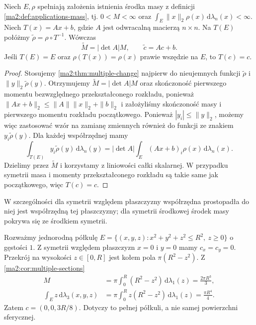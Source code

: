\begin{twierdzenie}
\label{ma2:thm:applications-center-affine}
Niech $E,\rho$ spełniają założenia istnienia
środka masy z definicji
\ref{ma2:def:applications-mass}, tj. $0<M<\infty$
oraz $\int_E\|x\|_2\rho(x)\,\mathrm d\lambda_n(x)<\infty$.
Niech
$T(x)=Ax+b$, gdzie $A$ jest odwracalną
macierzą $n\times n$. Na $T(E)$ połóżmy
$\widetilde\rho=\rho\circ T^{-1}$.
Wówczas
\[
 \widetilde M=|\det A|M,\qquad
 \widetilde c=Ac+b.
\]
Jeśli $T(E)=E$ oraz
$\rho(T(x))=\rho(x)$ prawie wszędzie na $E$,
to $T(c)=c$.
\end{twierdzenie}
\begin{proof}
Stosujemy \ref{ma2:thm:multiple-change}
najpierw do nieujemnych funkcji
$\widetilde\rho$ i $\|y\|_2\widetilde\rho(y)$.
Otrzymujemy $\widetilde M=|\det A|M$
oraz skończoność pierwszego momentu
bezwzględnego przekształconego rozkładu, ponieważ
$\|Ax+b\|_2\le\|A\|\|x\|_2+\|b\|_2$
i założyliśmy skończoność masy i pierwszego
momentu rozkładu początkowego.
Ponieważ $|y_i|\le\|y\|_2$, możemy więc
zastosować wzór na zamianę zmiennych
również do funkcji ze znakiem
$y_i\widetilde\rho(y)$.
Dla każdej współrzędnej mamy
\[
 \int_{T(E)}y_i\widetilde\rho(y)\,
 \mathrm d\lambda_n(y)
 =|\det A|\int_E (Ax+b)_i\rho(x)\,
 \mathrm d\lambda_n(x).
\]
Dzielimy przez $\widetilde M$ i korzystamy
z liniowości całki skalarnej.
W przypadku symetrii masa i momenty
przekształconego rozkładu są takie same
jak początkowego, więc $T(c)=c$.
\end{proof}
W szczególności dla symetrii względem
płaszczyzny współrzędna prostopadła do niej
jest współrzędną tej płaszczyzny; dla
symetrii środkowej środek masy pokrywa się
ze środkiem symetrii.

\begin{przyklad}
\label{ma2:ex:applications-hemisphere}
Rozważmy jednorodną półkulę
$E=\{(x,y,z):x^2+y^2+z^2\le R^2,\ z\ge0\}$
o gęstości $1$.
Z symetrii względem płaszczyzn $x=0$ i $y=0$
mamy $c_x=c_y=0$. Przekrój na wysokości
$z\in[0,R]$ jest kołem pola $\pi(R^2-z^2)$.
Z \ref{ma2:cor:multiple-sections}
\[
 \begin{aligned}
 M&=\pi\int_0^R(R^2-z^2)\,\mathrm d\lambda_1(z)
   =\frac{2\pi R^3}{3},\\
 \int_E z\,\mathrm d\lambda_3(x,y,z)
 &=\pi\int_0^R z(R^2-z^2)\,\mathrm d\lambda_1(z)
   =\frac{\pi R^4}{4}.
 \end{aligned}
\]
Zatem $c=(0,0,3R/8)$.
Dotyczy to pełnej półkuli, a nie samej
powierzchni sferycznej.
\end{przyklad}

